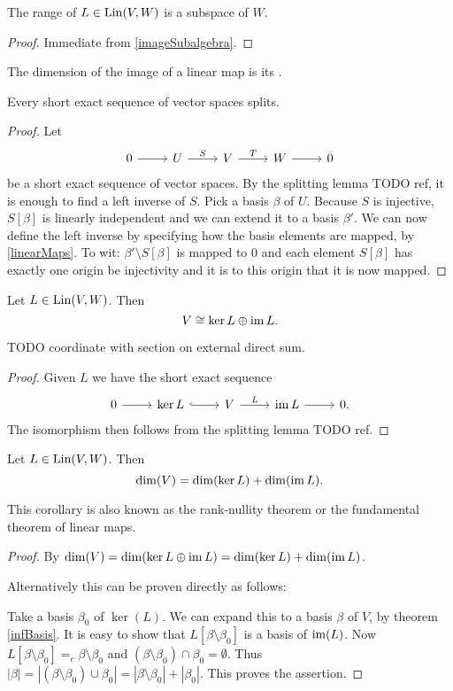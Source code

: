 \begin{lemma}
The range of $L\in \operatorname{Lin}(V,W)$ is a subspace of $W$.
\end{lemma}
\begin{proof}
Immediate from \ref{imageSubalgebra}.
\end{proof}
\begin{definition}
The dimension of the image of a linear map is its .
\end{definition}

\begin{theorem}
Every short exact sequence of vector spaces splits.
\end{theorem}
\begin{proof}
Let
\[ \begin{tikzcd}
0 \rar & U \rar{S} & V \rar{T} & W \rar & 0
\end{tikzcd} \]
be a short exact sequence of vector spaces.
By the splitting lemma TODO ref, it is enough to find a left inverse of $S$. Pick a basis $\beta$ of $U$. Because $S$ is injective, $S[\beta]$ is linearly independent and we can extend it to a basis $\beta'$. We can now define the left inverse by specifying how the basis elements are mapped, by \ref{linearMaps}. To wit: $\beta'\setminus S[\beta]$ is mapped to $0$ and each element $S[\beta]$ has exactly one origin be injectivity and it is to this origin that it is now mapped.
\end{proof}
\begin{corollary} \label{directSumKernelImage}
Let $L \in \operatorname{Lin}(V,W)$. Then
\[ V \cong \ker L \oplus \operatorname{im} L. \]
\end{corollary}
TODO coordinate with section on external direct sum.
\begin{proof}
Given $L$ we have the short exact sequence
\[ \begin{tikzcd}
0 \rar & \ker L \ar[r, hook] & V \rar{L} & \im L \rar & 0.
\end{tikzcd} \]
The isomorphism then follows from the splitting lemma TODO ref.
\end{proof}
\begin{corollary} \label{dimensionLinearMaps}
Let $L \in \operatorname{Lin}(V,W)$. Then
\[ \dim(V) = \dim(\ker L) + \dim(\operatorname{im} L). \]
\end{corollary}
This corollary is also known as the rank-nullity theorem or the fundamental theorem of linear maps.
\begin{proof}
By $\dim(V) = \dim(\ker L \oplus \operatorname{im} L) = \dim(\ker L) + \dim(\operatorname{im} L)$.

Alternatively this can be proven directly as follows:

Take a basis $\beta_0$ of $\ker(L)$. We can expand this to a basis $\beta$ of $V$, by theorem \ref{infBasis}. It is easy to show that $L[\beta\setminus \beta_0]$ is a basis of $\operatorname{im}(L)$. Now $L[\beta\setminus \beta_0] =_c \beta\setminus \beta_0$ and $(\beta\setminus \beta_0) \cap \beta_0 = \emptyset$. Thus $|\beta| = |(\beta\setminus \beta_0) \cup \beta_0| = |\beta\setminus \beta_0| + |\beta_0|$. This proves the assertion.
\end{proof}
